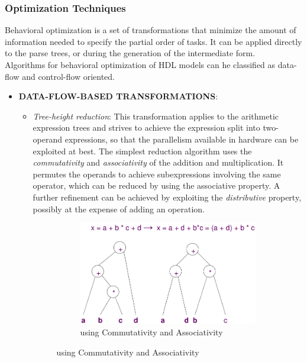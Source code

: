 \subsubsection{Optimization Techniques}
Behavioral optimization is a set of transformations that minimize the amount of information needed to specify the partial order of tasks. It can be applied directly to the parse trees, or during the generation of the intermediate form.\\
Algorithms for behavioral optimization of  HDL  models can he classified as data-flow and control-flow
oriented.
\begin{itemize}
\item \textbf{DATA-FLOW-BASED TRANSFORMATIONS}: 
	\begin{itemize}
	\item \textit{Tree-height reduction}: This transformation applies to the arithmetic expression trees and strives to achieve the expression split into two-operand expressions, so that the parallelism available in hardware can be exploited at best. The simplest reduction algorithm uses the \textit{commutativity} and \textit{associativity} of the addition and multiplication. It permutes the operands to achieve subexpressions involving the same operator, which can be reduced by using the associative property. A  further refinement can be achieved by exploiting the \textit{distributive} property, possibly at the expense of adding an operation.
	\begin{figure}[H]
    \centering
    \begin{subfigure}[b]{0.4\textwidth}
        \includegraphics[width=\textwidth]{./Cap3/Images/Image05.png}
        \caption{using Commutativity and Associativity}
        \label{fig:comAss}
    \end{subfigure}
    \quad\quad\quad

\end{figure}
\end{itemize}
\end{itemize}
